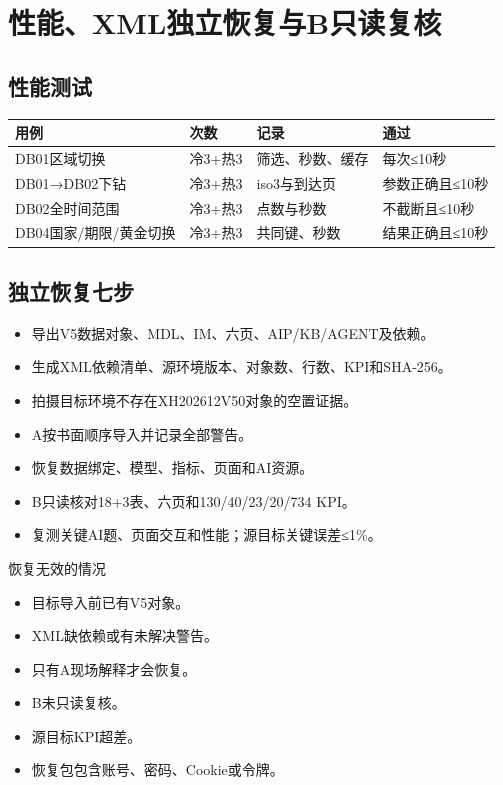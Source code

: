 \documentclass[UTF8,openany,zihao=-4]{ctexbook}
\renewcommand{\_}{\textunderscore\allowbreak}
\begin{document}
\chapter{性能、XML独立恢复与B只读复核}
\section{性能测试}
\noindent\begin{tabularx}{\textwidth}{@{}p{}p{}p{}X@{}}
\toprule
\textbf{用例} & \textbf{次数} & \textbf{记录} & \textbf{通过} \\
\midrule
DB01区域切换 & 冷3+热3 & 筛选、秒数、缓存 & 每次≤10秒 \\
DB01→DB02下钻 & 冷3+热3 & iso3与到达页 & 参数正确且≤10秒 \\
DB02全时间范围 & 冷3+热3 & 点数与秒数 & 不截断且≤10秒 \\
DB04国家/期限/黄金切换 & 冷3+热3 & 共同键、秒数 & 结果正确且≤10秒 \\
\bottomrule
\end{tabularx}
\section{独立恢复七步}
\begin{itemize}
\item 导出V5数据对象、MDL、IM、六页、AIP/KB/AGENT及依赖。
\item 生成XML依赖清单、源环境版本、对象数、行数、KPI和SHA-256。
\item 拍摄目标环境不存在XH202612\_V50对象的空置证据。
\item A按书面顺序导入并记录全部警告。
\item 恢复数据绑定、模型、指标、页面和AI资源。
\item B只读核对18+3表、六页和130/40/23/20/734 KPI。
\item 复测关键AI题、页面交互和性能；源目标关键误差≤1\%。
\end{itemize}
\begin{dangerbox}{恢复无效的情况}
\begin{itemize}
\item 目标导入前已有V5对象。
\item XML缺依赖或有未解决警告。
\item 只有A现场解释才会恢复。
\item B未只读复核。
\item 源目标KPI超差。
\item 恢复包包含账号、密码、Cookie或令牌。
\end{itemize}
\end{dangerbox}
\end{document}
